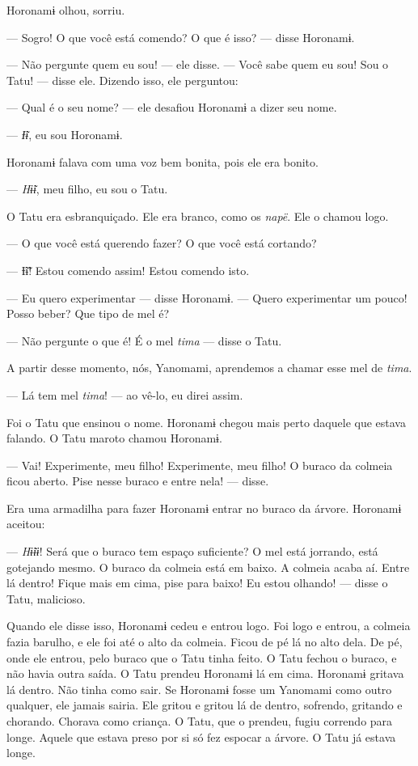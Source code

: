 Horonamɨ olhou, sorriu.

--- Sogro! O que você está comendo? O que é isso? --- disse Horonamɨ. 

--- Não pergunte quem eu sou! --- ele disse. --- Você sabe quem eu sou!
Sou o Tatu! --- disse ele. Dizendo isso, ele perguntou: 

--- Qual é o seu nome? --- ele desafiou Horonamɨ a dizer seu nome. 

--- \textit{Ɨ̃ɨ}, eu sou Horonamɨ. 

Horonamɨ falava com uma voz bem bonita, pois ele era bonito. 

--- \textit{Hɨ̃ɨ}, meu filho, eu sou o Tatu. 

O Tatu era esbranquiçado. Ele era branco, como os \textit{napë}. Ele o
chamou logo. 

--- O que você está querendo fazer? O que você está cortando? 

--- Ɨ̃ɨ̃! Estou comendo assim! Estou comendo isto.

--- Eu quero experimentar --- disse Horonamɨ. --- Quero experimentar um
pouco! Posso beber? Que tipo de mel é? 

--- Não pergunte o que é! É o mel \textit{tima} --- disse o Tatu. 

A partir desse momento, nós, Yanomami, aprendemos a chamar esse mel
de \textit{tima}. 

--- Lá tem mel \textit{tima}! --- ao vê-lo, eu direi assim. 

Foi o Tatu que ensinou o nome. Horonamɨ chegou mais perto daquele que
estava falando. O Tatu maroto chamou Horonamɨ. 

--- Vai! Experimente, meu filho! Experimente, meu filho! O buraco da
colmeia ficou aberto. Pise nesse buraco e entre nela! --- disse. 

Era uma armadilha para fazer Horonamɨ entrar no buraco da árvore. Horonamɨ
aceitou: 

--- \textit{Hɨ̃ɨɨ}! Será que o buraco tem espaço suficiente? O mel está jorrando,
está gotejando mesmo. O buraco da colmeia está em baixo. A colmeia acaba
aí. Entre lá dentro! Fique mais em cima, pise para baixo! Eu estou
olhando! --- disse o Tatu, malicioso. 

Quando ele disse isso, Horonamɨ cedeu e entrou logo. Foi logo e entrou,
a colmeia fazia barulho, e ele foi até o alto da colmeia. Ficou de pé lá
no alto dela. De pé, onde ele entrou, pelo buraco que o Tatu tinha feito.
O Tatu fechou o buraco, e não havia outra saída. O Tatu prendeu Horonamɨ
lá em cima. Horonamɨ gritava lá dentro. Não tinha como sair. Se Horonamɨ
fosse um Yanomami como outro qualquer, ele jamais sairia. Ele gritou e
gritou lá de dentro, sofrendo, gritando e chorando. Chorava como
criança. O Tatu, que o prendeu, fugiu correndo para longe. Aquele que
estava preso por si só fez espocar a árvore. O Tatu já estava longe. 

